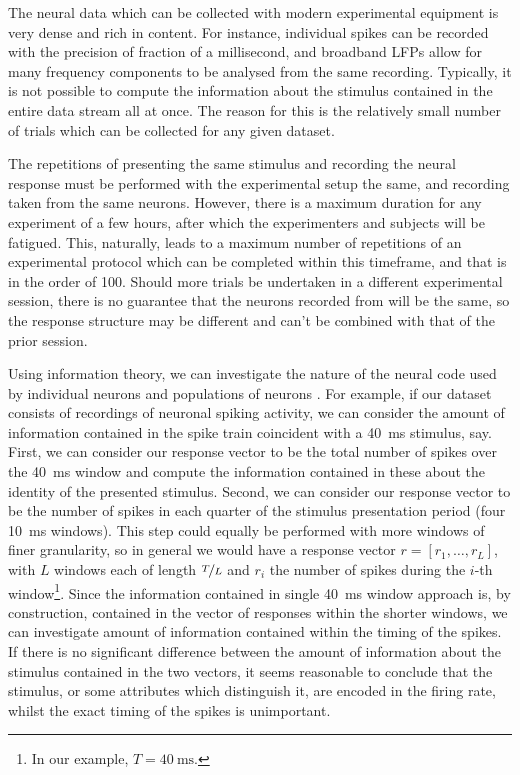 The neural data which can be collected with modern experimental equipment is very dense and rich in content.
For instance, individual spikes can be recorded with the precision of fraction of a millisecond, and broadband \acp{LFP} allow for many frequency components to be analysed from the same recording.
Typically, it is not possible to compute the information about the stimulus contained in the entire data stream all at once.
The reason for this is the relatively small number of trials which can be collected for any given dataset.

The repetitions of presenting the same stimulus and recording the neural response must be performed with the experimental setup the same, and recording taken from the same neurons.
However, there is a maximum duration for any \invivo{} experiment of a few hours, after which the experimenters and subjects will be fatigued.
This, naturally, leads to a maximum number of repetitions of an experimental protocol which can be completed within this timeframe, and that is in the order of 100.
Should more trials be undertaken in a different experimental session, there is no guarantee that the neurons recorded from will be the same, so the response structure may be different and can't be combined with that of the prior session.

Using information theory, we can investigate the nature of the neural code used by individual neurons and populations of neurons \citep{Optican1987}.
For example, if our dataset consists of recordings of neuronal spiking activity, we can consider the amount of information contained in the spike train coincident with a \SI{40}{\milli\second} stimulus, say.
First, we can consider our response vector to be the total number of spikes over the \SI{40}{\milli\second} window and compute the information contained in these about the identity of the presented stimulus.
Second, we can consider our response vector to be the number of spikes in each quarter of the stimulus presentation period (four \SI{10}{\milli\second} windows).
This step could equally be performed with more windows of finer granularity, so in general we would have a response vector $r = [r_1, \ldots, r_L]$, with $L$ windows each of length $\nicefrac{T}{L}$ and $r_i$ the number of spikes during the $i$-th window\footnote{In our example, $T = \SI{40}{\milli\second}$.}.
Since the information contained in single \SI{40}{\milli\second} window approach is, by construction, contained in the vector of responses within the shorter windows, we can investigate amount of information contained within the timing of the spikes.
If there is no significant difference between the amount of information about the stimulus contained in the two vectors, it seems reasonable to conclude that the stimulus, or some attributes which distinguish it, are encoded in the firing rate, whilst the exact timing of the spikes is unimportant.

